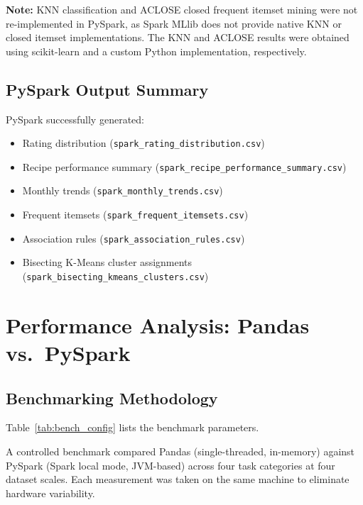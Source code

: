 \documentclass[12pt,a4paper]{article}
\begin{document}
\textbf{Note:} KNN classification and ACLOSE closed frequent itemset mining were not re-implemented in PySpark, as Spark MLlib does not provide native KNN or closed itemset implementations. The KNN and ACLOSE results were obtained using scikit-learn and a custom Python implementation, respectively.

\subsection{PySpark Output Summary}

PySpark successfully generated:
\begin{itemize}[nosep]
    \item Rating distribution (\texttt{spark\_rating\_distribution.csv})
    \item Recipe performance summary (\texttt{spark\_recipe\_performance\_summary.csv})
    \item Monthly trends (\texttt{spark\_monthly\_trends.csv})
    \item Frequent itemsets (\texttt{spark\_frequent\_itemsets.csv})
    \item Association rules (\texttt{spark\_association\_rules.csv})
    \item Bisecting K-Means cluster assignments (\texttt{spark\_bisecting\_kmeans\_clusters.csv})
\end{itemize}

\section{Performance Analysis: Pandas vs.\ PySpark}

\subsection{Benchmarking Methodology}

Table~\ref{tab:bench_config} lists the benchmark parameters.

A controlled benchmark compared Pandas (single-threaded, in-memory) against PySpark (Spark local mode, JVM-based) across four task categories at four dataset scales. Each measurement was taken on the same machine to eliminate hardware variability.
\end{document}
